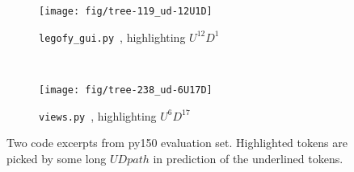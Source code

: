 \documentclass[nonacm, sigconf]{acmart}
\newcommand{\code}[1]{{\texttt{#1}}}
\begin{document}
\begin{figure*}
    \centering
    \begin{subfigure}[b]{0.45\textwidth}
        \texttt{[image: fig/tree-119\_ud-12U1D]}
        \caption{\code{legofy\_gui.py}~\protect\footnotemark, highlighting $U^{12} D^{1}$}
        \label{fig:long-ud-example-U12D1}
    \end{subfigure}
    ~ 
    \begin{subfigure}[b]{0.45\textwidth}
        \texttt{[image: fig/tree-238\_ud-6U17D]}
        \caption{\code{views.py}~\protect\footnotemark, highlighting $U^{6} D^{17}$}
        \label{fig:long-ud-example-U6D17}
    \end{subfigure}
    \caption{Two code excerpts from py150 evaluation set. Highlighted tokens are picked by some long $\mathit{UDpath}$ in prediction of the underlined tokens.
    }
    \label{fig:long-ud-example}
\end{figure*}
\addtocounter{footnote}{-2}
\end{document}
